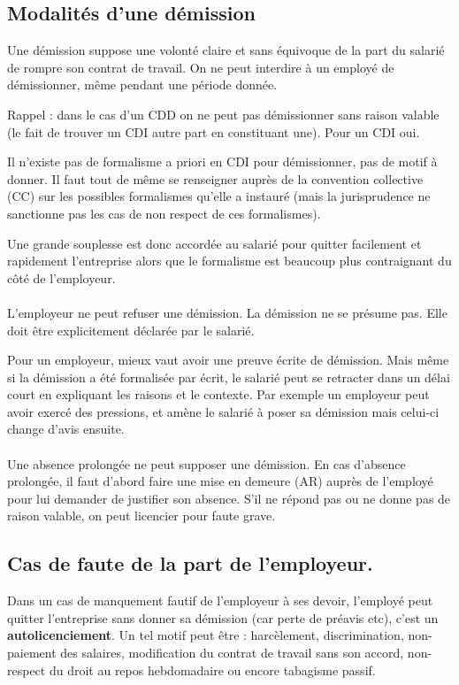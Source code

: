 \subsection{Modalités d'une démission}
	Une démission suppose une volonté claire et sans équivoque de la part du salarié de rompre son contrat de travail.
	On ne peut interdire à un employé de démissionner, même pendant une période donnée.

	Rappel : dans le cas d'un CDD on ne peut pas démissionner sans raison valable (le fait de trouver un CDI autre part en constituant une).
	Pour un CDI oui.

	Il n’existe pas de formalisme a priori en CDI pour démissionner, pas de motif à donner.
	Il faut tout de même se renseigner auprès de la convention collective (CC) sur les possibles formalismes qu’elle a instauré (mais la jurisprudence ne sanctionne pas les cas de non respect de ces formalismes).

	Une grande souplesse est donc accordée au salarié pour quitter facilement et rapidement l'entreprise alors que le formalisme est beaucoup plus contraignant du côté de l'employeur.

	\paragraph{}
	L’employeur ne peut refuser une démission.
	La démission ne se présume pas.
	Elle doit être explicitement déclarée par le salarié.

	Pour un employeur, mieux vaut avoir une preuve écrite de démission.
	Mais même si la démission a été formalisée par écrit, le salarié peut se retracter dans un délai court en expliquant les raisons et le contexte.
	Par exemple un employeur peut avoir exercé des pressions, et amène le salarié à poser sa démission mais celui-ci change d'avis ensuite.

	\paragraph{}
	Une absence prolongée ne peut supposer une démission.
	En cas d’absence prolongée, il faut d’abord faire une mise en demeure (AR) auprès de l’employé pour lui demander de justifier son absence.
	S’il ne répond pas ou ne donne pas de raison valable, on peut licencier pour faute grave.

\subsection{Cas de faute de la part de l'employeur.}
	\label{autoli}
	Dans un cas de manquement fautif de l'employeur à ses devoir, l'employé peut quitter l’entreprise sans donner sa démission (car perte de préavis etc), c'est un \textbf{autolicenciement}.
	Un tel motif peut être : harcèlement, discrimination, non-paiement des salaires, modification du contrat de travail sans son accord, non-respect du droit au repos hebdomadaire ou encore tabagisme passif.

